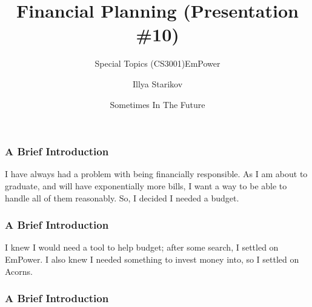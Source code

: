 \documentclass[xclolor=dvipsnames]{beamer}            %
\title{Financial Planning (Presentation \#10)}
\subtitle{Special Topics (CS3001)}
\author{Illya Starikov}
\date{Sometimes In The Future}
\institute{Missouri University of Science and Technology}
\begin{document}
\begin{darkframes}
    \maketitle

    \begin{frame}
        \frametitle{A Brief Introduction}

        I have always had a problem with being financially responsible. As I am about to graduate, and will have exponentially more bills, I want a way to be able to handle all of them reasonably. So, I decided I needed a budget.
    \end{frame}

    \begin{frame}
        \frametitle{A Brief Introduction}

        I knew I would need a tool to help budget; after some search, I settled on EmPower. I also knew I needed something to invest money into, so I settled on Acorns.
    \end{frame}

    \begin{frame}
        \frametitle{A Brief Introduction}
        \subtitle{EmPower}


\end{frame}
\end{darkframes}
\end{document}

